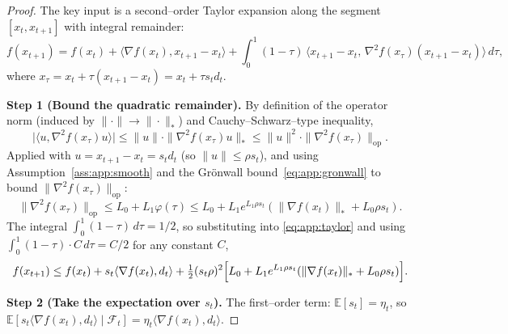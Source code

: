 \documentclass{article}
\theoremstyle{plain}
\theoremstyle{definition}
\theoremstyle{remark}
\begin{document}
\begin{proof}
The key input is a second--order Taylor expansion along the segment
$[x_t, x_{t+1}]$ with integral remainder:
\begin{equation}
  f(x_{t+1}) = f(x_t) + \langle \nabla f(x_t), x_{t+1} - x_t\rangle
    + \int_0^1 (1-\tau)\,\langle x_{t+1} - x_t,\, \nabla^2 f(x_\tau)(x_{t+1} - x_t)\rangle\, d\tau,
  \label{eq:app:taylor}
\end{equation}
where $x_\tau = x_t + \tau(x_{t+1} - x_t) = x_t + \tau s_t d_t$.

\smallskip\noindent\textbf{Step 1 (Bound the quadratic remainder).}
By definition of the operator norm (induced by $\|\cdot\| \to
\|\cdot\|_*$) and Cauchy--Schwarz--type inequality,
\[
  \bigl|\langle u, \nabla^2 f(x_\tau) u\rangle\bigr|
  \leq \|u\| \cdot \|\nabla^2 f(x_\tau) u\|_*
  \leq \|u\|^2 \cdot \|\nabla^2 f(x_\tau)\|_{\mathrm{op}}.
\]
Applied with $u = x_{t+1} - x_t = s_t d_t$ (so $\|u\| \leq \rho s_t$),
and using Assumption~\ref{ass:app:smooth} and the Gr\"onwall
bound~\eqref{eq:app:gronwall} to bound $\|\nabla^2 f(x_\tau)\|_{\mathrm{op}}$:
\[
  \|\nabla^2 f(x_\tau)\|_{\mathrm{op}}
  \leq L_0 + L_1 \varphi(\tau)
  \leq L_0 + L_1 e^{L_1\rho s_t}(\|\nabla f(x_t)\|_* + L_0\rho s_t).
\]
The integral $\int_0^1 (1-\tau)\, d\tau = 1/2$, so substituting into
\eqref{eq:app:taylor} and using $\int_0^1(1-\tau)\cdot C\, d\tau = C/2$
for any constant $C$,
\[
  f(x_{t+1}) \leq f(x_t) + s_t \langle \nabla f(x_t), d_t\rangle
    + \tfrac12 (s_t\rho)^2\Bigl[L_0 + L_1 e^{L_1\rho s_t}(\|\nabla f(x_t)\|_*
      + L_0\rho s_t)\Bigr].
\]

\smallskip\noindent\textbf{Step 2 (Take the expectation over $s_t$).}
The first--order term: $\mathbb{E}[s_t] = \eta_t$, so
$\mathbb{E}[s_t \langle\nabla f(x_t), d_t\rangle \mid \mathcal{F}_t] =
\eta_t\langle\nabla f(x_t), d_t\rangle$.


\end{proof}
\end{document}
